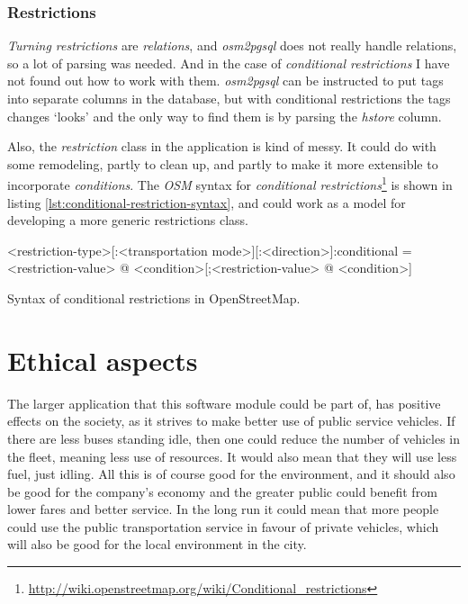 \documentclass[../main.tex]{subfiles}
\begin{document}
\subsubsection{Restrictions}
\textit{Turning restrictions} are \textit{relations}, and \textit{osm2pgsql} does not really handle relations, so a lot of parsing was needed. And in the case of \textit{conditional restrictions} I have not found out how to work with them. \textit{osm2pgsql} can be instructed to put tags into separate columns in the database, but with conditional restrictions the tags changes `looks' and the only way to find them is by parsing the \textit{hstore} column. 

Also, the \textit{restriction} class in the application is kind of messy. It could do with some remodeling, partly to clean up, and partly to make it more extensible to incorporate \textit{conditions}. The \textit{OSM} syntax for \textit{conditional restrictions}\footnote{\url{http://wiki.openstreetmap.org/wiki/Conditional_restrictions}} is shown in listing \ref{lst:conditional-restriction-syntax}, and could work as a model for developing a more generic restrictions class.

\begin{mylisting}
\begin{textcode}
<restriction-type>[:<transportation mode>][:<direction>]:conditional
  = <restriction-value> @ <condition>[;<restriction-value> @ <condition>]
\end{textcode}
\caption{Syntax of conditional restrictions in OpenStreetMap.}
\label{lst:conditional-restriction-syntax}
\end{mylisting}

\section{Ethical aspects}
The larger application that this software module could be part of, has positive effects on the society, as it strives to make better use of public service vehicles. If there are less buses standing idle, then one could reduce the number of vehicles in the fleet, meaning less use of resources. It would also mean that they will use less fuel, just idling. All this is of course good for the environment, and it should also be good for the company's economy and the greater public could benefit from lower fares and better service. In the long run it could mean that more people could use the public transportation service in favour of private vehicles, which will also be good for the local environment in the city.
\end{document}
